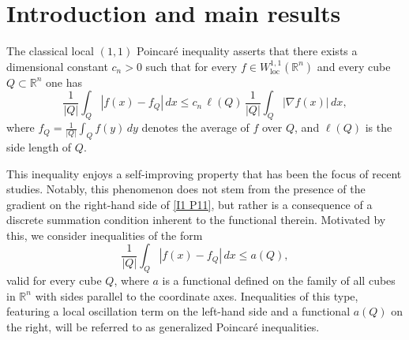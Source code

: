 \documentclass[reqno, 10pt, oneside]{amsart}
\numberwithin{equation}{section}
\numberwithin{theorem}{section}
\newcommand{\R}{{\mathbb R}}
\newcommand{\1}{{\rm 1\hspace*{-0.4ex}%
\rule{0.1ex}{1.52ex}\hspace*{0.2ex}}}
\begin{document}

\begin{abstract}
We establish several improvements to the main results of \cite{PR} and \cite{CP}, refining the seminal self-improving method for generalized Poincaré inequalities from \cite{FPW98, MP98}. These results, together with various related applications, stem from a general self-improving property for functions satisfying the local inequality$$\frac{1}{|Q|}\int_Q |f(x)-f_Q|\,dx \le a(Q)$$for all cubes $Q\subset\mathbb{R}^n$. The functional $a$ is assumed to obey a specific discrete geometric summability condition. By restricting our focus to axis-parallel cubes in $\mathbb{R}^n$, this geometric setting allows us to obtain sharper estimates than those available in more general metric measure spaces.
\end{abstract}

\maketitle





\section{Introduction and main results}



The classical local $(1,1)$ Poincaré inequality asserts that there exists a dimensional constant $c_n>0$ such that for every $f\in W^{1,1}_{\operatorname{loc}}(\R^n)$ and every cube $Q\subset \R^n$ one has 
\begin{equation}\label{I1 P11}
	\frac{1}{|Q|}\int_Q |f(x)-f_Q|\,dx \le c_n \,\ell(Q)\,\frac{1}{|Q|}\int_Q |\nabla f(x)|\,dx, 
\end{equation} 
where $f_Q=\frac{1}{|Q|}\int_Q f(y)\,dy$ denotes the average of $f$ over $Q$, and $\ell(Q)$ is the side length of $Q$.  

This inequality enjoys a self-improving property that has been the focus of recent studies. Notably, this phenomenon does not stem from the presence of the gradient on the right-hand side of \eqref{I1 P11}, but rather is a consequence of a discrete summation condition inherent to the functional therein. Motivated by this, we consider inequalities of the form 
\begin{equation}\label{I2}
	\frac{1}{|Q|}\int_Q |f(x)-f_Q|\,dx \le a(Q),
\end{equation}
valid for every cube $Q$, where $a$ is a functional defined on the family of all cubes in $\R^n$ with sides parallel to the coordinate axes. 
 Inequalities of this type, featuring a local oscillation term on the left-hand side and a functional $a(Q)$ on the right, will be referred to as generalized Poincaré inequalities. 
\end{document}
